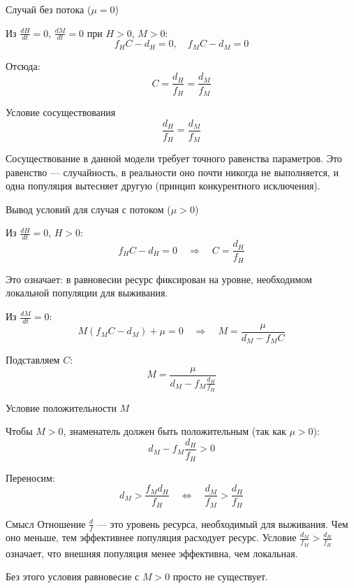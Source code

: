 \documentclass[12pt]{beamer}
\begin{document}
\begin{frame}{Случай без потока ($\mu = 0$)}

Из $\frac{dH}{dt}=0$, $\frac{dM}{dt}=0$ при $H>0$, $M>0$:
\[f_H C - d_H = 0, \quad f_M C - d_M = 0\]

Отсюда:
\[C = \frac{d_H}{f_H} = \frac{d_M}{f_M}\]

\begin{block}{Условие сосуществования}
\[\frac{d_H}{f_H} = \frac{d_M}{f_M}\]
\end{block}

Сосуществование в данной модели требует точного равенства параметров. Это равенство  — случайность, в реальности оно почти никогда не выполняется, и одна популяция вытесняет другую (принцип конкурентного исключения).

\end{frame}

\begin{frame}{Вывод условий для случая с потоком ($\mu > 0$)}

Из $\frac{dH}{dt}=0$, $H>0$:
\[f_H C - d_H = 0 \quad \Rightarrow \quad C = \frac{d_H}{f_H}\]

Это означает: в равновесии ресурс фиксирован на уровне, необходимом локальной популяции для выживания.

Из $\frac{dM}{dt}=0$:
\[M(f_M C - d_M) + \mu = 0 \quad \Rightarrow \quad M = \frac{\mu}{d_M - f_M C}\]

Подставляем $C$:
\[M = \frac{\mu}{d_M - f_M \frac{d_H}{f_H}}\]

\end{frame}

\begin{frame}{Условие положительности $M$}

Чтобы $M > 0$, знаменатель должен быть положительным (так как $\mu>0$):
\[d_M - f_M \frac{d_H}{f_H} > 0\]

Переносим:
\[d_M > \frac{f_M d_H}{f_H} \quad \Leftrightarrow \quad \frac{d_M}{f_M} > \frac{d_H}{f_H}\]

\begin{exampleblock}{Смысл}
Отношение $\frac{d}{f}$ — это уровень ресурса, необходимый для выживания. 
Чем оно меньше, тем эффективнее популяция расходует ресурс. 
Условие $\frac{d_M}{f_M} > \frac{d_H}{f_H}$ означает, что внешняя популяция менее эффективна, чем локальная.
\end{exampleblock}

Без этого условия равновесие с $M>0$ просто не существует.

\end{frame}
\end{document}
